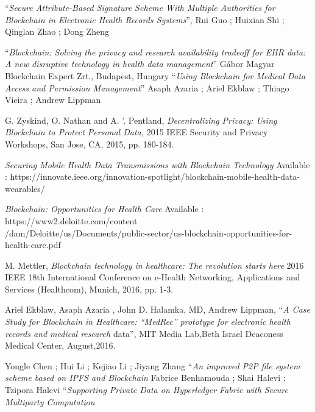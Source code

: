\documentclass[11pt]{report}
\begin{document}

\begin{thebibliography}{999}



 \textquotedblleft  \textit{Secure Attribute-Based Signature Scheme With Multiple Authorities for Blockchain in Electronic Health Records Systems}\textquotedblright, 
Rui Guo  ; Huixian Shi ; Qinglan Zhao ; Dong Zheng


 \textquotedblleft \textit{Blockchain: Solving the privacy and research availability tradeoff for EHR data: A new disruptive technology in health data management}\textquotedblright 
Gábor Magyar
Blockchain Expert Zrt., Budapest, Hungary
 \textquotedblleft \textit{Using Blockchain for Medical Data Access and Permission Management}\textquotedblright 
Asaph Azaria ; Ariel Ekblaw ; Thiago Vieira ; Andrew Lippman

\bibitem G. Zyskind, O. Nathan and A. '. Pentland, \textit{Decentralizing Privacy: Using Blockchain to Protect Personal Data,} 2015 IEEE Security and Privacy Workshops, San Jose, CA, 2015, pp. 180-184.

\textit{Securing Mobile Health Data Transmissions with Blockchain Technology}
Available : https://innovate.ieee.org/innovation-spotlight/blockchain-mobile-health-data-wearables/

\textit{Blockchain: 
Opportunities for Health Care }
Available : https://www2.deloitte.com/content\\/dam/Deloitte/us/Documents/public-sector/us-blockchain-opportunities-for-health-care.pdf

M. Mettler, \textit{Blockchain technology in healthcare: The revolution starts here} 2016 IEEE 18th International Conference on e-Health Networking, Applications and Services (Healthcom), Munich, 2016, pp. 1-3.


 Ariel Ekblaw, Asaph Azaria , John D. Halamka, MD, Andrew Lippman, \textquotedblleft \textit{A Case Study for Blockchain in Healthcare:
“MedRec” prototype for electronic health records and medical research} data\textquotedblright, MIT Media Lab,Beth Israel Deaconess Medical Center, August,2016.

 Yongle Chen ; Hui Li ; Kejiao Li ; Jiyang Zhang \textquotedblleft \textit{An improved P2P file system scheme based on IPFS and Blockchain}
 Fabrice Benhamouda ; Shai Halevi ; Tzipora Halevi \textquotedblleft \textit{Supporting Private Data on Hyperledger Fabric with Secure Multiparty Computation}
\end{thebibliography}
 
\end{document}
